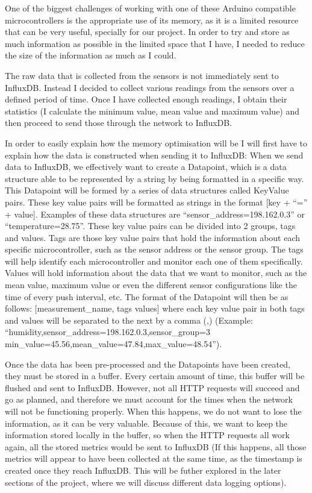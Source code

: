 \documentclass[12pt]{article}
\begin{document}
One of the biggest challenges of working with one of these Arduino compatible microcontrollers is the appropriate use of its memory, as it is a limited resource that can be very useful, specially for our project. In order to try and store as much information as possible in the limited space that I have, I needed to reduce the size of the information as much as I could.\par

The raw data that is collected from the sensors is not immediately sent to InfluxDB. Instead I decided to collect various readings from the sensors over a defined period of time. Once I have collected enough readings, I obtain their statistics (I calculate the minimum value, mean value and maximum value) and then proceed to send those through the network to InfluxDB.\par 

In order to easily explain how the memory optimisation will be I will first have to explain how the data is constructed when sending it to InfluxDB: When we send data to InfluxDB, we effectively want to create a Datapoint, which is a data structure able to be represented by a string by being formatted in a specific way. This Datapoint will be formed by a series of data structures called KeyValue pairs. These key value pairs will be formatted as strings in the format [key + ``='' + value]. Examples of these data structures are ``sensor\_address=198.162.0.3'' or ``temperature=28.75''. These key value pairs can be divided into 2 groups, tags and values. Tags are those key value pairs that hold the information about each specific microcontroller, such as the sensor address or the sensor group. The tags will help identify each microcontroller and monitor each one of them specifically. Values will hold information about the data that we want to monitor, such as the mean value, maximum value or even the different sensor configurations like the time of every push interval, etc. The format of the Datapoint will then be as follows: [measurement\_name, tags values] where each key value pair in both tags and values will be separated to the next by a comma (,) (Example: ``humidity,sensor\_address=198.162.0.3,sensor\_group=3 min\_value=45.56,mean\_value=47.84,max\_value=48.54'').\par

Once the data has been pre-processed and the Datapoints have been created, they must be stored in a buffer. Every certain amount of time, this buffer will be flushed and sent to InfluxDB. However, not all HTTP requests will succeed and go as planned, and therefore we must account for the times when the network will not be functioning properly. When this happens, we do not want to lose the information, as it can be very valuable. Because of this, we want to keep the information stored locally in the buffer, so when the HTTP requests all work again, all the stored metrics would be sent to InfluxDB (If this happens, all those metrics will appear to have been collected at the same time, as the timestamp is created once they reach InfluxDB. This will be futher explored in the later sections of the project, where we will discuss different data logging options).\par
\end{document}
